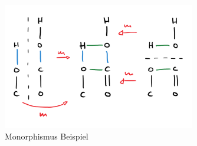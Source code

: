 \begin{figure}
    \centering
    \includegraphics[width=0.75\textwidth]{figures/monomorphism.png}
    \caption{Monorphismus Beispiel}
    \label{fig:monomorphism}
\end{figure}
